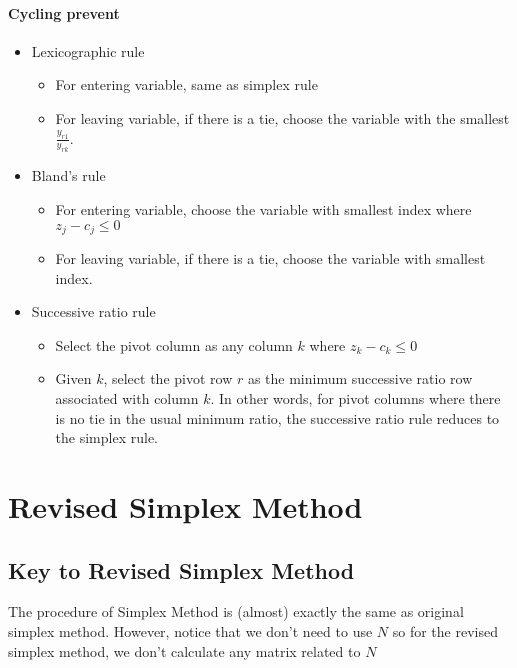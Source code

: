                 \paragraph{Cycling prevent}
                    \begin{itemize}
                        \item Lexicographic rule
                        \begin{itemize}
                            \item For entering variable, same as simplex rule
                            \item For leaving variable, if there is a tie, choose the variable with the smallest $\frac{y_{r1}}{y_{rk}}$.
                        \end{itemize}
                        \item Bland's rule
                        \begin{itemize}
                            \item For entering variable, choose the variable with smallest index where $z_j - c_j \le 0$
                            \item For leaving variable, if there is a tie, choose the variable with smallest index.
                        \end{itemize}
                        \item Successive ratio rule
                        \begin{itemize}
                            \item Select the pivot column as any column $k$ where $z_k - c_k \le 0$
                            \item Given $k$, select the pivot row $r$ as the minimum successive ratio row associated with column $k$. In other words, for pivot columns where there is no tie in the usual minimum ratio, the successive ratio rule reduces to the simplex rule.
                        \end{itemize}
                    \end{itemize}

        \section{Revised Simplex Method}
            \subsection{Key to Revised Simplex Method}
                The procedure of Simplex Method is (almost) exactly the same as original simplex method. However, notice that we don't need to use $N$ so for the revised simplex method, we don't calculate any matrix related to $N$


